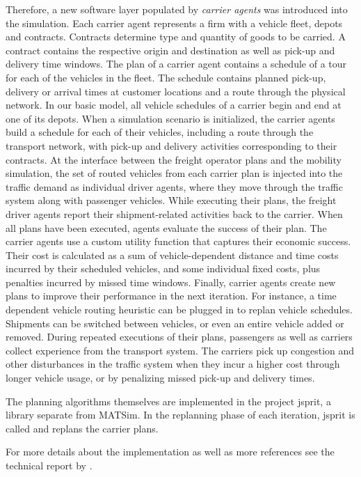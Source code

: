 Therefore, a new software layer populated by \emph{carrier agents} was introduced into the
simulation. Each carrier agent represents a firm with a vehicle fleet, depots and contracts.
Contracts determine type and quantity of goods to be carried. A contract contains the respective 
origin and destination as well as pick-up and delivery time windows.
The plan of a carrier agent contains a schedule of a tour for each of the vehicles in the fleet. 
The schedule contains planned pick-up, delivery or arrival times at customer locations and a route through 
the physical network. In our basic model, all vehicle schedules of a carrier begin and end at one of its depots.
When a simulation scenario is initialized, the carrier agents build a schedule for each of their vehicles, 
including a route through the transport network, with pick-up and delivery activities corresponding to their contracts.
At the interface between the freight operator plans and the mobility simulation, the set of routed vehicles 
from each carrier plan is injected into the traffic demand as individual driver agents, where they move 
through the traffic system along with passenger vehicles. While executing their plans, the freight driver 
agents report their shipment-related activities back to the carrier.
When all plans have been executed, agents evaluate the success of their plan. The carrier agents use a custom 
utility function that captures their economic success. Their cost is calculated as a sum of vehicle-dependent 
distance and time costs incurred by their scheduled vehicles, and some individual fixed costs, plus penalties 
incurred by missed time windows.
Finally, carrier agents create new plans to improve their performance in the next iteration. For instance, 
a time dependent vehicle routing heuristic can be plugged in to replan vehicle schedules. Shipments can be 
switched between vehicles, or even an entire vehicle added or removed.
During repeated executions of their plans, passengers as well as carriers collect experience from the transport 
system. The carriers pick up congestion and other disturbances in the traffic system when they incur a higher 
cost through longer vehicle usage, or by penalizing missed pick-up and delivery times.

The planning algorithms themselves are implemented in the project jsprit, a library separate from MATSim.
In the replanning phase of each iteration, jsprit is called and replans the carrier plans.

For more details about the implementation as well as more references see the technical report by \citet[][]{ZilskeEtAl_TechRep_VSP_2012}.


